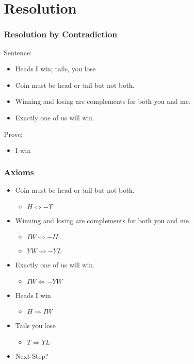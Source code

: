 \documentclass[compress, 9pt]{beamer}
\begin{document}
\section{Resolution}
\label{sec-3}
\begin{frame}
\frametitle{Resolution by Contradiction}
\label{sec-3-1}

Sentence:  
\begin{itemize}
\item Heads I win; tails, you lose
\item <2-> Coin must be head or tail but not both.
\item <2-> Winning and losing are complements for both you and me.
\item <2-> Exactly one of us will win.
\end{itemize}

Prove: 
\begin{itemize}
\item I win
\end{itemize}
\end{frame}
\begin{frame}
\frametitle{Axioms}
\label{sec-3-2}

\begin{itemize}
\item Coin must be head or tail but not both.
\begin{itemize}
\item <2-> $H \Leftrightarrow -T$
\end{itemize}
\item Winning and losing are complements for both you and me.
\begin{itemize}
\item <2-> $IW \Leftrightarrow -IL$
\item <2-> $YW \Leftrightarrow -YL$
\end{itemize}
\item Exactly one of us will win.
\begin{itemize}
\item <2-> $IW \Leftrightarrow -YW$
\end{itemize}
\item Heads I win
\begin{itemize}
\item <2-> $H \Rightarrow IW$
\end{itemize}
\item Tails you lose
\begin{itemize}
\item <2-> $T \Rightarrow YL$
\end{itemize}
\item <3-> Next Step?
\end{itemize}
\end{frame}
\end{document}
